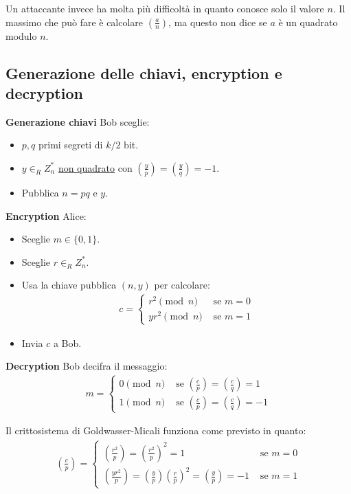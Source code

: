 \noindent Un attaccante invece ha molta più difficoltà in quanto conosce solo il valore $n$. Il massimo che può fare è calcolare $\left(\frac{a}{n}\right)$, ma questo non dice se $a$ è un quadrato modulo $n$.

\subsection{Generazione delle chiavi, encryption e decryption}

\textbf{Generazione chiavi}
\noindent Bob sceglie:
\begin{itemize}
    \item $p, q$ primi segreti  di $k/2$ bit.
    \item $y \in_R Z_n^*$ \underline{non quadrato} con $(\frac{y}{p}) = (\frac{y}{q}) = -1$.
    \item Pubblica $n = pq$ e $y$.
\end{itemize}

\noindent \textbf{Encryption}
\noindent Alice:
\begin{itemize}
    \item Sceglie $m \in \{0, 1\}$.
    \item Sceglie $r \in_R Z_n^*$.
    \item Usa la chiave pubblica $(n, y)$ per calcolare:
    \begin{align*}
        c = \begin{cases}
                r^2 \pmod n & \text{ se } m=0\\
                yr^2 \pmod n & \text{ se } m=1
        \end{cases}
    \end{align*}
    \item Invia $c$ a Bob.
\end{itemize}

\noindent \textbf{Decryption}
\noindent Bob decifra il messaggio:
\begin{align*}
    m = \begin{cases}
                0 \pmod n & \text{ se } \left(\frac{c}{p} \right) = \left(\frac{c}{q} \right) = 1\\
                1 \pmod n & \text{ se } \left(\frac{c}{p} \right) = \left(\frac{c}{q} \right) = -1
        \end{cases}
\end{align*}

\noindent Il crittosistema di Goldwasser-Micali funziona come previsto in quanto:
\begin{align*}
    \left(\frac{c}{p} \right) = 
        \begin{cases}
                \left(\frac{r^2}{p} \right) = \left(\frac{r^2}{p} \right)^2 = 1 & \text{ se } m = 0\\
                \left(\frac{yr^2}{p} \right) = \left(\frac{y}{p} \right)\left(\frac{r}{p} \right)^2 = \left(\frac{y}{p} \right) = -1 & \text{ se } m = 1
        \end{cases}
\end{align*}

